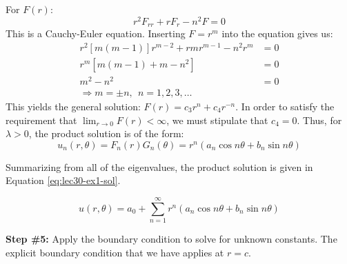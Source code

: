 For $F(r)$:
\begin{equation*}
r^2F_{rr} + rF_{r} - n^2F = 0 
\end{equation*}
This is a Cauchy-Euler equation.  Inserting $F = r^m$ into the equation gives us:
\begin{align*}
r^2[m(m-1)]r^{m-2} + rmr^{m-1} - n^2r^m &= 0 \\
r^m[m(m-1)+m - n^2] &= 0 \\
m^2-n^2 &= 0 \\
\Rightarrow m = \pm n, \ \ n = 1,2,3,\dots
\end{align*}
This yields the general solution: $F(r) = c_3r^n + c_4r^{-n}$.  In order to satisfy the requirement that $\lim_{r \to 0} F(r) < \infty$, we must stipulate that $c_4 = 0$.  Thus, for $\lambda > 0$, the product solution is of the form:
\begin{equation*}
u_n(r,\theta) = F_n(r)G_n(\theta) = r^n\left(a_n \cos{n \theta} + b_n \sin{n \theta} \right)
\end{equation*}

\vspace{0.15cm}

\noindent Summarizing from all of the eigenvalues, the product solution is given in Equation \ref{eq:lec30-ex1-sol}.

\begin{equation}
u(r,\theta) = a_0 + \sum\limits_{n=1}^{\infty} r^n \left( a_n \cos{n \theta} + b_n \sin{n \theta} \right)
\label{eq:lec30-ex1-sol}
\end{equation}

\vspace{0.25cm}

\noindent\textbf{Step \#5:} Apply the boundary condition to solve for unknown constants.  The explicit boundary condition that we have applies at $r=c$. 

